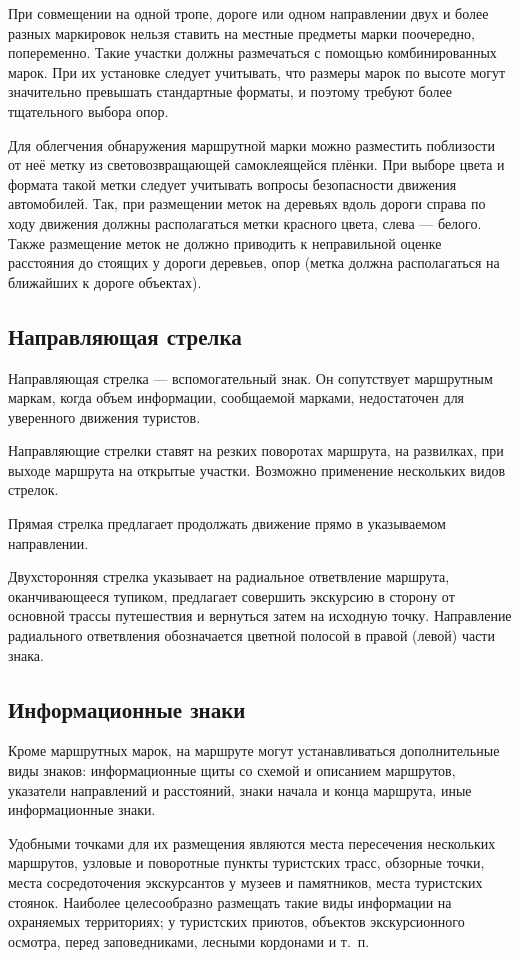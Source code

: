 \documentclass[a4paper,12pt]{extarticle}
\begin{document}
При совмещении на одной тропе, дороге или одном направлении двух и более разных маркировок нельзя ставить на местные
предметы марки поочередно, попеременно. Такие участки должны размечаться с помощью комбинированных марок. При их
установке следует учитывать, что размеры марок по высоте могут значительно превышать стандартные форматы, и поэтому
требуют более тщательного выбора опор.

Для облегчения обнаружения маршрутной марки можно разместить поблизости от неё метку из световозвращающей самоклеящейся
плёнки. При выборе цвета и формата такой метки следует учитывать вопросы безопасности движения автомобилей. Так, при
размещении меток на деревьях вдоль дороги справа по ходу движения должны располагаться метки красного цвета, слева ---
белого. Также размещение меток не должно приводить к неправильной оценке расстояния до стоящих у дороги деревьев, опор
(метка должна располагаться на ближайших к дороге объектах).

\subsection{Направляющая стрелка}
Направляющая стрелка --- вспомогательный знак. Он сопутствует маршрутным маркам, когда объем информации, сообщаемой
марками, недостаточен для уверенного движения туристов.

Направляющие стрелки ставят на резких поворотах маршрута, на развилках, при выходе маршрута на открытые участки.
Возможно применение нескольких видов стрелок.

Прямая стрелка предлагает продолжать движение прямо в указываемом направлении.

Двухсторонняя стрелка указывает на радиальное ответвление маршрута, оканчивающееся тупиком, предлагает
совершить экскурсию в сторону от основной трассы путешествия и вернуться затем на исходную точку. Направление
радиального ответвления обозначается цветной полосой в правой (левой) части знака.

\subsection{Информационные знаки}
Кроме маршрутных марок, на маршруте могут устанавливаться дополнительные виды знаков: информационные щиты со схемой и
описанием маршрутов, указатели направлений и расстояний, знаки начала и конца маршрута, иные информационные знаки.

Удобными точками для их размещения являются места пересечения нескольких маршрутов, узловые и поворотные пункты
туристских трасс, обзорные точки, места сосредоточения экскурсантов у музеев и памятников, места туристских стоянок.
Наиболее целесообразно размещать такие виды информации на охраняемых территориях; у туристских приютов, объектов
экскурсионного осмотра, перед заповедниками, лесными кордонами и т.~п.
\end{document}
